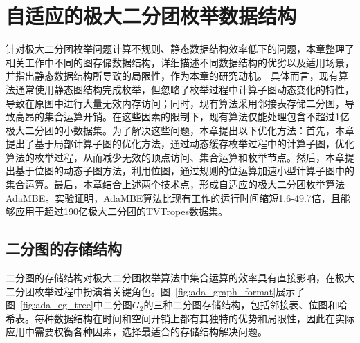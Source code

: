 \chapter{自适应的极大二分团枚举数据结构}
\label{ch:adapt_mbe}

针对极大二分团枚举问题计算不规则、静态数据结构效率低下的问题，本章整理了相关工作中不同的图存储数据结构，详细描述不同数据结构的优劣以及适用场景，并指出静态数据结构所导致的局限性，作为本章的研究动机。
具体而言，现有算法通常使用静态图结构完成枚举，但忽略了枚举过程中计算子图动态变化的特性，导致在原图中进行大量无效内存访问；同时，现有算法采用邻接表存储二分图，导致高昂的集合运算开销。在这些因素的限制下，现有算法仅能处理包含不超过1亿极大二分团的小数据集。为了解决这些问题，本章提出以下优化方法：首先，本章提出了基于局部计算子图的优化方法，通过动态缓存枚举过程中的计算子图，优化算法的枚举过程，从而减少无效的顶点访问、集合运算和枚举节点。然后，本章提出基于位图的动态子图方法，利用位图，通过规则的位运算加速小型计算子图中的集合运算。最后，本章结合上述两个技术点，形成自适应的极大二分团枚举算法AdaMBE。实验证明，AdaMBE算法比现有工作的运行时间缩短1.6-49.7倍，且能够应用于超过190亿极大二分团的TVTropes数据集。






\section{二分图的存储结构}
\label{subsec:ada_representation}

二分图的存储结构对极大二分团枚举算法中集合运算的效率具有直接影响，在极大二分团枚举过程中扮演着关键角色。图~\ref{fig:ada_graph_format}展示了图~\ref{fig:ada_eg_tree}中二分图$G_2$的三种二分图存储结构，包括邻接表、位图和哈希表。每种数据结构在时间和空间开销上都有其独特的优势和局限性，因此在实际应用中需要权衡各种因素，选择最适合的存储结构解决问题。

